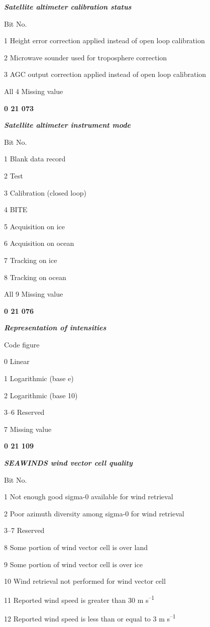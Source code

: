 \emph{\textbf{Satellite altimeter calibration status}}

Bit No.

1 Height error correction applied instead of open loop calibration

2 Microwave sounder used for troposphere correction

3 AGC output correction applied instead of open loop calibration

All 4 Missing value

\textbf{0 21 073}

\emph{\textbf{Satellite altimeter instrument mode}}

Bit No.

1 Blank data record

2 Test

3 Calibration (closed loop)

4 BITE

5 Acquisition on ice

6 Acquisition on ocean

7 Tracking on ice

8 Tracking on ocean

All 9 Missing value

\textbf{0 21 076}

\emph{\textbf{Representation of intensities}}

Code figure

0 Linear

1 Logarithmic (base e)

2 Logarithmic (base 10)

3--6 Reserved

7 Missing value

\textbf{0 21 109}

\emph{\textbf{SEAWINDS wind vector cell quality}}

Bit No.

1 Not enough good sigma-0 available for wind retrieval

2 Poor azimuth diversity among sigma-0 for wind retrieval

3--7 Reserved

8 Some portion of wind vector cell is over land

9 Some portion of wind vector cell is over ice

10 Wind retrieval not performed for wind vector cell

11 Reported wind speed is greater than 30 m s\textsuperscript{--1}

12 Reported wind speed is less than or equal to 3 m s\textsuperscript{--1}

